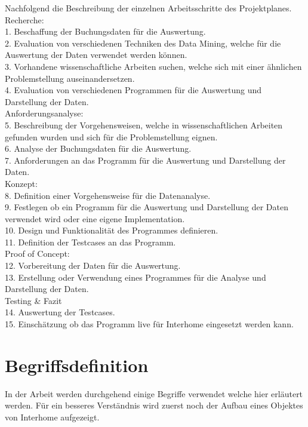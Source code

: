 {\parindent0pt %
Nachfolgend die Beschreibung der einzelnen Arbeitsschritte des Projektplanes.\\

Recherche:\\
1. Beschaffung der Buchungsdaten für die Auswertung.\\
2. Evaluation von verschiedenen Techniken des Data Mining, welche für die Auswertung der Daten verwendet werden können.\\
3. Vorhandene wissenschaftliche Arbeiten suchen, welche sich mit einer ähnlichen Problemstellung auseinandersetzen.\\
4. Evaluation von verschiedenen Programmen für die Auswertung und Darstellung der Daten.\\

Anforderungsanalyse:\\
5. Beschreibung der Vorgehensweisen, welche in wissenschaftlichen Arbeiten gefunden wurden und sich für die Problemstellung eignen. \\
6. Analyse der Buchungsdaten für die Auswertung.\\
7. Anforderungen an das Programm für die Auswertung und Darstellung der Daten.\\

Konzept:\\
8. Definition einer Vorgehensweise für die Datenanalyse.\\
9. Festlegen ob ein Programm für die Auswertung und Darstellung der Daten verwendet wird oder eine eigene Implementation.\\
10. Design und Funktionalität des Programmes definieren.\\
11. Definition der Testcases an das Programm.\\

Proof of Concept:\\
12. Vorbereitung der Daten für die Auswertung.\\
13. Erstellung oder Verwendung eines Programmes für die Analyse und Darstellung der Daten.\\

Testing \& Fazit\\
14. Auswertung der Testcases.\\
15. Einschätzung ob das Programm live für Interhome eingesetzt werden kann.
}

\section{Begriffsdefinition}
\label{sec:einletung:begriffsdefinition}
In der Arbeit werden durchgehend einige Begriffe verwendet welche hier erläutert werden. Für ein besseres Verständnis wird zuerst noch der Aufbau eines Objektes von Interhome aufgezeigt.

